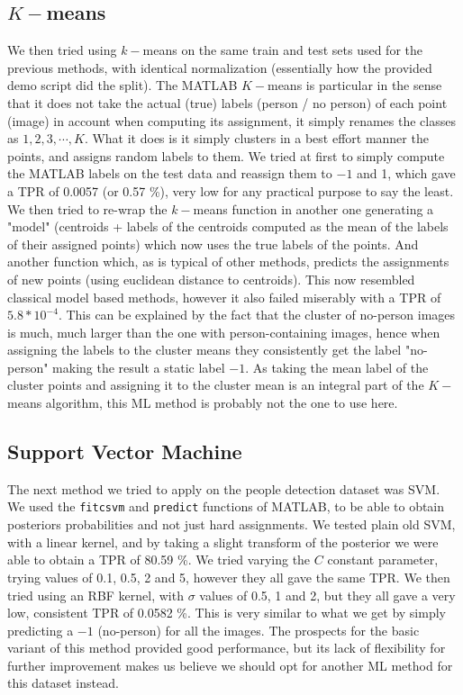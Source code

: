 \documentclass{article} %
\begin{document}
\subsection{$K-$means}
We then tried using $k-$means on the same train and test sets used for the previous methods, with identical normalization (essentially how the provided demo script did the split). The MATLAB $K-$means is particular in the sense that it does not take the actual (true) labels (person / no person) of each point (image) in account when computing its assignment, it simply renames the classes as $1, 2, 3, \cdots, K$. What it does is it simply clusters in a best effort manner the points, and assigns random labels to them. We tried at first to simply compute the MATLAB labels on the test data and reassign them to $-1$ and 1, which gave a TPR of 0.0057 (or 0.57 \%), very low for any practical purpose to say the least. We then tried to re-wrap the $k-$means function in another one generating a "model" (centroids + labels of the centroids computed as the mean of the labels of their assigned points) which now uses the true labels of the points. And another function which, as is typical of other methods, predicts the assignments of new points (using euclidean distance to centroids). This now resembled classical model based methods, however it also failed miserably with a TPR of $5.8*10^{-4}$. This can be explained by the fact that the cluster of no-person images is much, much larger than the one with person-containing images, hence when assigning the labels to the cluster means they consistently get the label "no-person" making the result a static label $-1$. As taking the mean label of the cluster points and assigning it to the cluster mean is an integral part of the $K-$means algorithm, this ML method is probably not the one to use here.

\subsection{Support Vector Machine}
The next method we tried to apply on the people detection dataset was SVM. We used the \texttt{fitcsvm} and \texttt{predict} functions of MATLAB, to be able to obtain posteriors probabilities and not just hard assignments. We tested plain old SVM, with a linear kernel, and by taking a slight transform of the posterior we were able to obtain a TPR of 80.59 \%. We tried varying the $C$ constant parameter, trying values of 0.1, 0.5, 2 and 5, however they all gave the same TPR. We then tried using an RBF kernel, with $\sigma$ values of 0.5, 1 and 2, but they all gave a very low, consistent TPR of 0.0582 \%. This is very similar to what we get by simply predicting a $-1$ (no-person) for all the images. The prospects for the basic variant of this method provided good performance, but its lack of flexibility for further improvement makes us believe we should opt for another ML method for this dataset instead.
\end{document}
